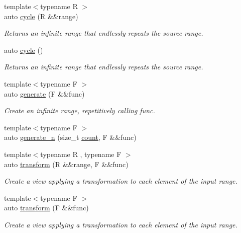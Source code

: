 \begin{DoxyCompactItemize}
{\footnotesize template$<$typename R $>$ }\\auto \mbox{\hyperlink{namespacerah_1_1view_a10a6eaf79243d6db807937d4f549419a}{cycle}} (R \&\&range)
\begin{DoxyCompactList}\small\item\em Returns an infinite range that endlessly repeats the source range. \end{DoxyCompactList}\item 
auto \mbox{\hyperlink{namespacerah_1_1view_a6d591740e70c1b826cabbec89e0df2be}{cycle}} ()
\begin{DoxyCompactList}\small\item\em Returns an infinite range that endlessly repeats the source range. \end{DoxyCompactList}\item 
{\footnotesize template$<$typename F $>$ }\\auto \mbox{\hyperlink{namespacerah_1_1view_a9851b1ee90ae15252fb248417e084f69}{generate}} (F \&\&func)
\begin{DoxyCompactList}\small\item\em Create an infinite range, repetitively calling func. \end{DoxyCompactList}\item 
{\footnotesize template$<$typename F $>$ }\\auto \mbox{\hyperlink{namespacerah_1_1view_ad1a52ac589db4f20ad204ce1df0d6835}{generate\+\_\+n}} (size\+\_\+t \mbox{\hyperlink{namespacerah_aa528865cc4a45d4eb276329554f16b4b}{count}}, F \&\&func)
\item 
{\footnotesize template$<$typename R , typename F $>$ }\\auto \mbox{\hyperlink{namespacerah_1_1view_ad8750f5c95edcf4f26b0a1c1eec3d676}{transform}} (R \&\&range, F \&\&func)
\begin{DoxyCompactList}\small\item\em Create a view applying a transformation to each element of the input range. \end{DoxyCompactList}\item 
{\footnotesize template$<$typename F $>$ }\\auto \mbox{\hyperlink{namespacerah_1_1view_a7c981c90e5ad03eca3ec738176feaf7d}{transform}} (F \&\&func)
\begin{DoxyCompactList}\small\item\em Create a view applying a transformation to each element of the input range. \end{DoxyCompactList}\item 

\end{DoxyCompactItemize}
